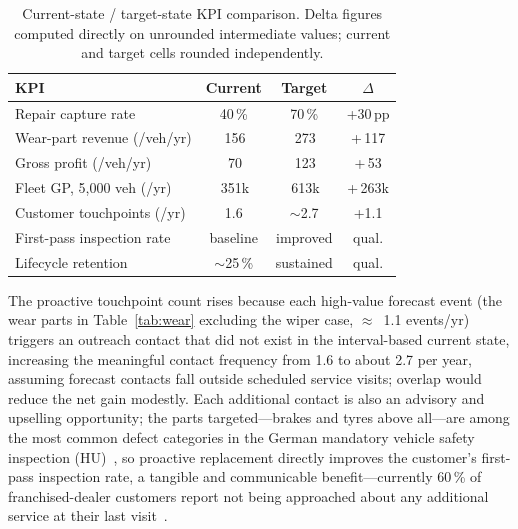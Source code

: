 \documentclass[conference,a4paper]{IEEEtran}
\newcommand{\eur}{\ifmmode\text{\texteuro}\else\texteuro\fi}
\begin{document}
\begin{table}[h!]
\caption{Current-state / target-state KPI comparison. Delta figures computed directly on unrounded intermediate values; current and target cells rounded independently.}
\label{tab:kpi}
\centering
\small
\begin{tabularx}{\columnwidth}{@{} >{\raggedright\arraybackslash}X c c c @{}}
\toprule
\textbf{KPI} & \textbf{Current} & \textbf{Target} & \textbf{$\Delta$} \\
\midrule
Repair capture rate              & 40\,\%     & 70\,\%      & +30\,pp \\
Wear-part revenue (/veh/yr)      & \eur\,156  & \eur\,273   & +\eur\,117 \\
Gross profit (/veh/yr)           & \eur\,70   & \eur\,123   & +\eur\,53 \\
Fleet GP, 5{,}000 veh (/yr)      & \eur\,351k & \eur\,613k  & +\eur\,263k \\
Customer touchpoints (/yr)       & 1.6        & $\sim$2.7   & +1.1 \\
First-pass inspection rate       & baseline   & improved    & qual. \\
Lifecycle retention~\cite{mckinsey2025dealer} & $\sim$25\,\% & sustained & qual. \\
\bottomrule
\end{tabularx}
\end{table}
 
The proactive touchpoint count rises because each high-value forecast event
(the wear parts in Table~\ref{tab:wear} excluding the wiper case,
$\approx$~1.1 events/yr) triggers an outreach contact that did not exist in the
interval-based current state, increasing the meaningful contact frequency
from 1.6 to about 2.7 per year, assuming forecast contacts fall outside
scheduled service visits; overlap would reduce the net gain modestly. Each additional contact is also an advisory and
upselling opportunity; the parts targeted---brakes and tyres above all---are
among the most common defect categories in the German mandatory vehicle safety
inspection (HU)~\cite{tuev2026report}, so proactive replacement directly improves the
customer's first-pass inspection rate, a tangible and communicable benefit---currently
60\,\% of franchised-dealer customers report not being approached about any
additional service at their last visit~\cite{dat2026report}.
 
\end{document}

